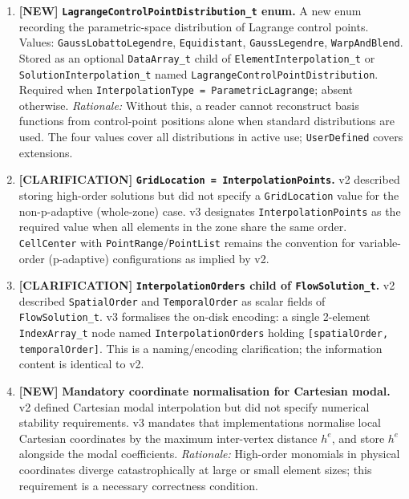 \documentclass[11pt,letterpaper]{article}
\newcommand{\NEW}{\textcolor{newgreen}{\textbf{[NEW]}}}
\newcommand{\CLARIFY}{\textcolor{clarifyyellow}{\textbf{[CLARIFICATION]}}}
\begin{document}
\begin{enumerate}[leftmargin=1.5em]

  \item \NEW{} \textbf{\texttt{LagrangeControlPointDistribution\_t} enum.}
  A new enum recording the parametric-space distribution of Lagrange control points.
  Values: \texttt{GaussLobattoLegendre}, \texttt{Equidistant}, \texttt{GaussLegendre},
  \texttt{WarpAndBlend}.  Stored as an optional \texttt{DataArray\_t} child of
  \texttt{ElementInterpolation\_t} or \texttt{SolutionInterpolation\_t} named
  \texttt{LagrangeControlPointDistribution}.  Required when
  \texttt{InterpolationType = ParametricLagrange}; absent otherwise.
  \textit{Rationale:} Without this, a reader cannot reconstruct basis functions from
  control-point positions alone when standard distributions are used.  The four values cover
  all distributions in active use; \texttt{UserDefined} covers extensions.

  \item \CLARIFY{} \textbf{\texttt{GridLocation = InterpolationPoints}.}
  v2 described storing high-order solutions but did not specify a \texttt{GridLocation}
  value for the non-p-adaptive (whole-zone) case.  v3 designates
  \texttt{InterpolationPoints} as the required value when all elements in the zone share the
  same order.  \texttt{CellCenter} with \texttt{PointRange}/\texttt{PointList} remains the
  convention for variable-order (p-adaptive) configurations as implied by v2.

  \item \CLARIFY{} \textbf{\texttt{InterpolationOrders} child of \texttt{FlowSolution\_t}.}
  v2 described \texttt{SpatialOrder} and \texttt{TemporalOrder} as scalar fields of
  \texttt{FlowSolution\_t}.  v3 formalises the on-disk encoding: a single 2-element
  \texttt{IndexArray\_t} node named \texttt{InterpolationOrders} holding
  \texttt{[spatialOrder, temporalOrder]}.  This is a naming/encoding clarification; the
  information content is identical to v2.

  \item \NEW{} \textbf{Mandatory coordinate normalisation for Cartesian modal.}
  v2 defined Cartesian modal interpolation but did not specify numerical stability
  requirements.  v3 mandates that implementations normalise local Cartesian coordinates by
  the maximum inter-vertex distance $h^e$, and store $h^e$ alongside the modal coefficients.
  \textit{Rationale:} High-order monomials in physical coordinates diverge catastrophically
  at large or small element sizes; this requirement is a necessary correctness condition.

\end{enumerate}
\end{document}
